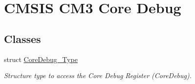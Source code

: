 \hypertarget{group___c_m_s_i_s___c_m3___core_debug}{\section{C\-M\-S\-I\-S C\-M3 Core Debug}
\label{group___c_m_s_i_s___c_m3___core_debug}
}
\subsection*{Classes}
\begin{DoxyCompactItemize}
\item 
struct \hyperlink{struct_core_debug___type}{Core\-Debug\-\_\-\-Type}
\begin{DoxyCompactList}\small\item\em Structure type to access the Core Debug Register (Core\-Debug). \end{DoxyCompactList}\end{DoxyCompactItemize}

